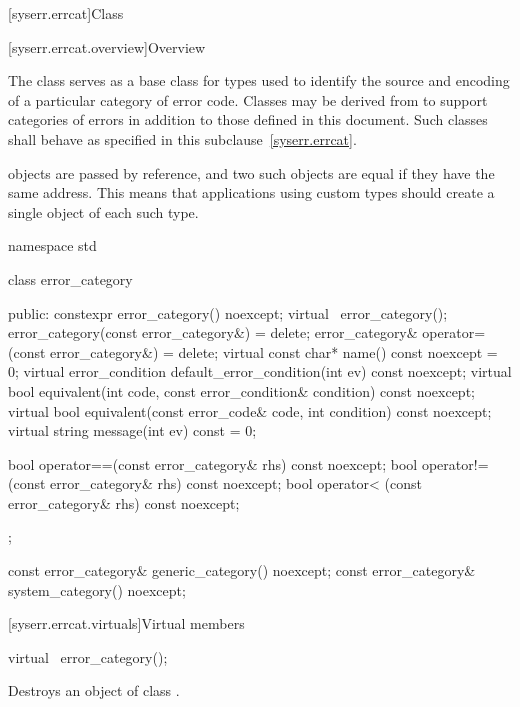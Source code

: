 [syserr.errcat]{Class }

[syserr.errcat.overview]{Overview}

\pnum
The class  serves as a base class for types used
to identify the source and encoding of a particular category of error code.
Classes may be derived from  to support
categories of errors in addition to those defined in this document.
Such classes shall behave as specified in this
subclause~\ref{syserr.errcat}. \begin{note}  objects are
passed by reference, and two such objects
are equal if they have the same address. This means that applications using
custom  types should create a single object of each
such type. \end{note}

%
%
%
\begin{codeblock}
namespace std {
  class error_category {
  public:
    constexpr error_category() noexcept;
    virtual ~error_category();
    error_category(const error_category&) = delete;
    error_category& operator=(const error_category&) = delete;
    virtual const char* name() const noexcept = 0;
    virtual error_condition default_error_condition(int ev) const noexcept;
    virtual bool equivalent(int code, const error_condition& condition) const noexcept;
    virtual bool equivalent(const error_code& code, int condition) const noexcept;
    virtual string message(int ev) const = 0;

    bool operator==(const error_category& rhs) const noexcept;
    bool operator!=(const error_category& rhs) const noexcept;
    bool operator< (const error_category& rhs) const noexcept;
  };

  const error_category& generic_category() noexcept;
  const error_category& system_category() noexcept;
}
\end{codeblock}

[syserr.errcat.virtuals]{Virtual members}

\begin{removedblock}
%
\begin{itemdecl}
virtual ~error_category();
\end{itemdecl}

\begin{itemdescr}
\pnum
\effects Destroys an object of class .
\end{itemdescr}
\end{removedblock}

